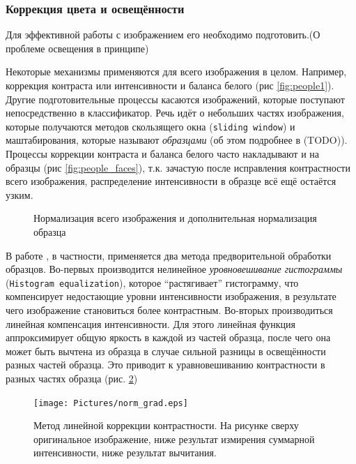 \documentclass[12pt]{report}
\begin{document}
\subsubsection{Коррекция цвета и освещённости}
\label{sec:preprocessing_theor}
Для эффективной работы с изображением его необходимо подготовить.(О проблеме освещения в принципе)

Некоторые механизмы применяются для всего изображения в целом. Например, коррекция контраста или интенсивности и баланса белого (рис \ref{fig:people1}). Другие подготовительные процессы касаются изображений, которые поступают непосредственно в классификатор. Речь идёт о небольших частях изображения, которые получаются методов скользящего окна (\texttt{sliding window}) и маштабирования, которые называют \emph{образцами} (об этом подробнее в (TODO)). Процессы коррекции контраста и баланса белого часто накладывают и на образцы (рис \ref{fig:people_faces}), т.к. зачастую после исправления контрастности всего изображения, распределение интенсивности в образце всё ещё остаётся узким.

\begin{figure}[h]
	\centering
	\caption{Нормализация всего изображения  и дополнительная нормализация образца }
	\label{fig:normalize_example}
\end{figure}

В работе \citep{rowley1998neural}, в частности, применяется два метода предворительной обработки образцов. Во-первых производится нелинейное \emph{уровновешивание гистограммы} (\texttt{Histogram equalization}), которое ``растягивает'' гистограмму, что компенсирует недостающие уровни интенсивности изображения, в результате чего изображение становиться более контрастным. Во-вторых производиться линейная компенсация интенсивности. Для этого линейная функция аппроксимирует общую яркость в каждой из частей образца, после чего она может быть вычтена из образца в случае сильной разницы в освещённости разных частей образца. Это приводит к уравновешиванию контрастности в разных частях образца (рис. \ref{fig:norm_grad}) 

\begin{figure}[h]
	\centering
	\texttt{[image: Pictures/norm\_grad.eps]}
	\caption{Метод линейной коррекции контрастности. На рисунке сверху оригинальное изображение, ниже результат измирения суммарной интенсивности, ниже результат вычитания. \citep{rowley1998neural}}
	\label{fig:norm_grad}
\end{figure}
\end{document}
